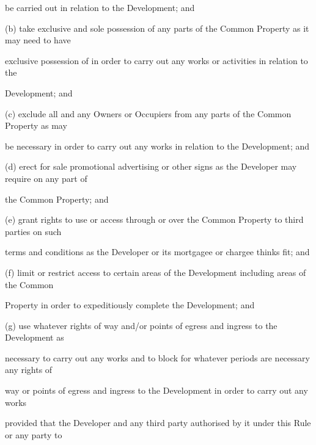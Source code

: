 \documentclass{article}
\begin{document}
{\fontsize{10.02}{1}be carried out in relation to the Development; and }

{\fontsize{9.962}{1}(b) take exclusive and sole possession of any parts of the Common Property as it may need to have }

{\fontsize{10.02}{1}exclusive possession of in order to carry out any works or activities in relation to the }

\newpage


















{\fontsize{10.02}{1}Development; and }

{\fontsize{9.962}{1}(c) exclude all and any Owners or Occupiers from any parts of the Common Property as may }


{\fontsize{10.02}{1}be necessary in order to carry out any works in relation to the Development; and }

{\fontsize{9.962}{1}(d) erect for sale promotional advertising or other signs as the Developer may require on any part of }

{\fontsize{10.02}{1}the Common Property; and }

{\fontsize{9.962}{1}(e) grant rights to use or access through or over the Common Property to third parties on such }

{\fontsize{10.02}{1}terms and conditions as the Developer or its mortgagee or chargee thinks fit; and }

{\fontsize{9.962}{1}(f) limit or restrict access to certain areas of the Development including areas of the Common }

{\fontsize{10.02}{1}Property in order to expeditiously complete the Development; and }

{\fontsize{9.962}{1}(g) use whatever rights of way and/or points of egress and ingress to the Development as }

{\fontsize{10.02}{1}necessary to carry out any works and to block for whatever periods are necessary any rights of }

{\fontsize{10.02}{1}way or points of egress and ingress to the Development in order to carry out any works }

{\fontsize{10.02}{1}provided that the Developer and any third party authorised by it under this Rule or any party to }
\end{document}
